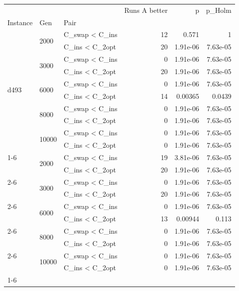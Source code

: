 \begin{tabular}{lllrrr}
\toprule
 &  &  & Runs A better & p & p\_Holm \\
Instance & Gen & Pair &  &  &  \\
\midrule
\multirow[t]{10}{*}{d493} & \multirow[t]{2}{*}{2000} & C\_swap < C\_ins & 12 & 0.571 & 1 \\
 &  & C\_ins < C\_2opt & 20 & 1.91e-06 & 7.63e-05 \\
\cline{2-6}
 & \multirow[t]{2}{*}{3000} & C\_swap < C\_ins & 0 & 1.91e-06 & 7.63e-05 \\
 &  & C\_ins < C\_2opt & 20 & 1.91e-06 & 7.63e-05 \\
\cline{2-6}
 & \multirow[t]{2}{*}{6000} & C\_swap < C\_ins & 0 & 1.91e-06 & 7.63e-05 \\
 &  & C\_ins < C\_2opt & 14 & 0.00365 & 0.0439 \\
\cline{2-6}
 & \multirow[t]{2}{*}{8000} & C\_swap < C\_ins & 0 & 1.91e-06 & 7.63e-05 \\
 &  & C\_ins < C\_2opt & 0 & 1.91e-06 & 7.63e-05 \\
\cline{2-6}
 & \multirow[t]{2}{*}{10000} & C\_swap < C\_ins & 0 & 1.91e-06 & 7.63e-05 \\
 &  & C\_ins < C\_2opt & 0 & 1.91e-06 & 7.63e-05 \\
\cline{1-6} \cline{2-6}
\multirow[t]{10}{*}{u574} & \multirow[t]{2}{*}{2000} & C\_swap < C\_ins & 19 & 3.81e-06 & 7.63e-05 \\
 &  & C\_ins < C\_2opt & 20 & 1.91e-06 & 7.63e-05 \\
\cline{2-6}
 & \multirow[t]{2}{*}{3000} & C\_swap < C\_ins & 0 & 1.91e-06 & 7.63e-05 \\
 &  & C\_ins < C\_2opt & 20 & 1.91e-06 & 7.63e-05 \\
\cline{2-6}
 & \multirow[t]{2}{*}{6000} & C\_swap < C\_ins & 0 & 1.91e-06 & 7.63e-05 \\
 &  & C\_ins < C\_2opt & 13 & 0.00944 & 0.113 \\
\cline{2-6}
 & \multirow[t]{2}{*}{8000} & C\_swap < C\_ins & 0 & 1.91e-06 & 7.63e-05 \\
 &  & C\_ins < C\_2opt & 0 & 1.91e-06 & 7.63e-05 \\
\cline{2-6}
 & \multirow[t]{2}{*}{10000} & C\_swap < C\_ins & 0 & 1.91e-06 & 7.63e-05 \\
 &  & C\_ins < C\_2opt & 0 & 1.91e-06 & 7.63e-05 \\
\cline{1-6} \cline{2-6}
\bottomrule
\end{tabular}
